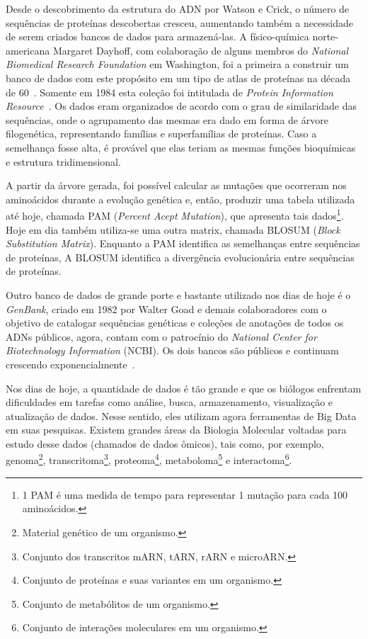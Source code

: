 \indent Desde o descobrimento da estrutura do ADN por Watson e Crick, o número de sequências de proteínas descobertas cresceu, aumentando também a necessidade de serem criados bancos de dados para armazená-las. A físico-química norte-americana Margaret Dayhoff, com colaboração de alguns membros do \textit{National Biomedical Research Foundation} em Washington, foi a primeira a construir um banco de dados com este propósito em um tipo de atlas de proteínas na década de 60~\cite{mount01}. Somente em 1984 esta coleção foi intitulada de \textit{Protein Information Resource}~\cite{mount01}. Os dados eram organizados de acordo com o grau de similaridade das sequências, onde o agrupamento das mesmas era dado em forma de árvore filogenética, representando famílias e superfamílias de proteínas. Caso a semelhança fosse alta, é provável que elas teriam as mesmas funções bioquímicas e estrutura tridimensional.

\indent A partir da árvore gerada, foi possível calcular as mutações que ocorreram nos aminoácidos durante a evolução genética e, então, produzir uma tabela utilizada até hoje, chamada PAM (\textit{Percent Acept Mutation}), que apresenta tais dados\footnote{1 PAM é uma medida de tempo para representar 1 mutação para cada 100 aminoácidos.}. Hoje em dia também utiliza-se uma outra matrix, chamada BLOSUM (\textit{Block Substitution Matrix}). Enquanto a PAM identifica as semelhanças entre sequências de proteínas, A BLOSUM identifica a divergência evolucionária entre sequências de proteínas.

\indent Outro banco de dados de grande porte e bastante utilizado nos dias de hoje é o \textit{GenBank}, criado em 1982 por Walter Goad e demais colaboradores com o objetivo de catalogar sequências genéticas e coleções de anotações de todos os ADNs públicos, agora, contam com o patrocínio do \textit{National Center for Biotechnology Information} (NCBI). Os dois bancos são públicos e continuam crescendo exponencialmente~\cite{mount01}. 


\indent Nos dias de hoje, a quantidade de dados é tão grande e  que os biólogos enfrentam dificuldades em tarefas como análise, busca, armazenamento, visualização e atualização de dados. Nesse sentido, eles utilizam agora ferramentas de Big Data em suas pesquisas. Existem grandes áreas da Biologia Molecular voltadas para estudo desse dados (chamados de dados ômicos), tais como, por exemplo, genoma\footnote{Material genético de um organismo.}, transcritoma\footnote{Conjunto dos transcritos mARN, tARN, rARN e microARN.}, proteoma\footnote{Conjunto de proteínas e suas variantes em um organismo.}, metaboloma\footnote{Conjunto de metabólitos de um organismo.} e interactoma\footnote{Conjunto de interações moleculares em um organismo.}.

